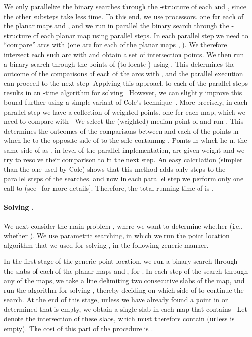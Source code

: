 \documentclass[a4paper,12pt]{article}
\begin{document}
We only parallelize the binary searches through the -structure of
each  and , since the other substeps take less time.
To this end, we use  processors, one for each of the
planar maps  and , and we run in parallel the binary
search through the -structure of each planar map using  parallel steps. In each parallel step we need to ``compare''
 arcs with  (one arc for each of the planar maps
, ). We therefore intersect each such arc with  and
obtain a set  of  intersection points. We then run a
binary search through the points of  (to locate ) using
. This determines the outcome of the comparisons of each of
the arcs with , and the parallel execution can proceed to the
next step. Applying this approach to each of the 
parallel steps results in an -time
algorithm for solving . However, we can slightly improve
this bound further using a simple variant of Cole's
technique~\cite{RC}. More precisely, in each parallel step we have a
collection  of  weighted points, one for each map,
which we need to compare with . We select the (weighted) median
point  of  and run . This determines the
outcomes of the comparisons between  and each of the points in
 which lie to the opposite side of  to the side containing
. Points in  which lie in the same side of  as ,
in level  of the parallel implementation, are given weight
 and we try to resolve their comparison to  in the
next step. An easy calculation (simpler than the one used by Cole)
shows that this method adds only  steps to the  parallel steps of the searches, and now in each parallel step we
perform only one call to  (see~\cite{RC} for more details).
Therefore, the total running time of  is .

\paragraph{\bf Solving .}
\label{subsec:Pi_2}
We next consider the main problem , where we want to
determine whether  (i.e., whether ). We use parametric searching, in which we run the point
location algorithm that we used for solving , in the
following generic manner.

In the first stage of the generic point location, we run a binary
search through the slabs of each of the planar maps  and
, for . In each step of the search through any
of the maps, we take a line  delimiting two consecutive slabs
of the map, and run the algorithm for solving , thereby
deciding on which side of  to continue the search. At the end
of this stage, unless we have already found a point in  or
determined that  is empty, we obtain a single slab in each map
that contains .  Let  denote the intersection of these
slabs, which must therefore contain  (unless  is empty). The
cost of this part of the procedure is .
\end{document}
